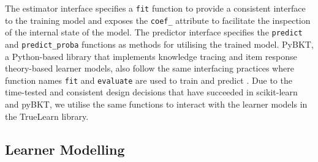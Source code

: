 \documentclass[letterpaper]{article} %
\begin{document}
The estimator interface specifies a \verb|fit| function to provide a consistent interface to the training model and exposes the \verb|coef_| attribute to facilitate the inspection of the internal state of the model. The predictor interface specifies the \verb|predict| and \verb|predict_proba| functions as methods for utilising the trained model. PyBKT, a Python-based library that implements knowledge tracing and item response theory-based learner models, also follow the same interfacing practices where function names \verb|fit| and \verb|evaluate| are used to train and predict \cite{psych5030050}. 
Due to the time-tested and consistent design decisions that have succeeded in scikit-learn and pyBKT, we utilise the same functions to interact with the learner models in the TrueLearn library.


\subsection{Learner Modelling}
\end{document}
